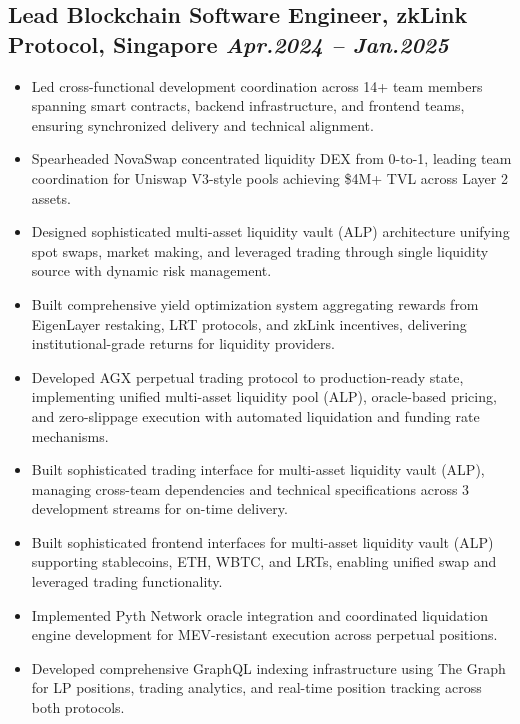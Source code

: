 \documentclass[11pt,a4paper]{article}
\newcommand{\resumeItem}[1]{\item\small{#1}}
\begin{document}
\subsection{Lead Blockchain Software Engineer, zkLink Protocol, Singapore \hfill \textit{Apr.2024 -- Jan.2025}}
\begin{itemize}[leftmargin=*, itemsep=1pt, parsep=0pt]
    \resumeItem{Led cross-functional development coordination across 14+ team members spanning smart contracts, backend infrastructure, and frontend teams, ensuring synchronized delivery and technical alignment.}
    \resumeItem{Spearheaded NovaSwap concentrated liquidity DEX from 0-to-1, leading team coordination for Uniswap V3-style pools achieving \$4M+ TVL across Layer 2 assets.}
    \resumeItem{Designed sophisticated multi-asset liquidity vault (ALP) architecture unifying spot swaps, market making, and leveraged trading through single liquidity source with dynamic risk management.}
    \resumeItem{Built comprehensive yield optimization system aggregating rewards from EigenLayer restaking, LRT protocols, and zkLink incentives, delivering institutional-grade returns for liquidity providers.}
    \resumeItem{Developed AGX perpetual trading protocol to production-ready state, implementing unified multi-asset liquidity pool (ALP), oracle-based pricing, and zero-slippage execution with automated liquidation and funding rate mechanisms.}
    \resumeItem{Built sophisticated trading interface for multi-asset liquidity vault (ALP), managing cross-team dependencies and technical specifications across 3 development streams for on-time delivery.}
    \resumeItem{Built sophisticated frontend interfaces for multi-asset liquidity vault (ALP) supporting stablecoins, ETH, WBTC, and LRTs, enabling unified swap and leveraged trading functionality.}
    \resumeItem{Implemented Pyth Network oracle integration and coordinated liquidation engine development for MEV-resistant execution across perpetual positions.}
    \resumeItem{Developed comprehensive GraphQL indexing infrastructure using The Graph for LP positions, trading analytics, and real-time position tracking across both protocols.}

\end{itemize}
\end{document}
